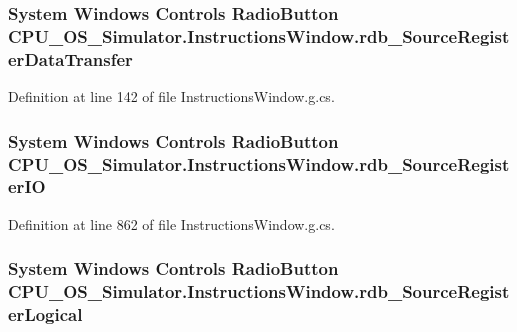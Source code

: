 \subsubsection[{rdb\+\_\+\+Source\+Register\+Data\+Transfer}]{\setlength{\rightskip}{0pt plus 5cm}System Windows Controls Radio\+Button C\+P\+U\+\_\+\+O\+S\+\_\+\+Simulator.\+Instructions\+Window.\+rdb\+\_\+\+Source\+Register\+Data\+Transfer\hspace{0.3cm}{\ttfamily [package]}}\label{class_c_p_u___o_s___simulator_1_1_instructions_window_a0d449427537f2c5baea2e2b7e669a9d7}


Definition at line 142 of file Instructions\+Window.\+g.\+cs.

\hypertarget{class_c_p_u___o_s___simulator_1_1_instructions_window_a30064f400e25a6b155a34108a3fba816}{}
\subsubsection[{rdb\+\_\+\+Source\+Register\+I\+O}]{\setlength{\rightskip}{0pt plus 5cm}System Windows Controls Radio\+Button C\+P\+U\+\_\+\+O\+S\+\_\+\+Simulator.\+Instructions\+Window.\+rdb\+\_\+\+Source\+Register\+I\+O\hspace{0.3cm}{\ttfamily [package]}}\label{class_c_p_u___o_s___simulator_1_1_instructions_window_a30064f400e25a6b155a34108a3fba816}


Definition at line 862 of file Instructions\+Window.\+g.\+cs.

\hypertarget{class_c_p_u___o_s___simulator_1_1_instructions_window_ab8c8622e8a96238fb88e455d60c51e78}{}
\subsubsection[{rdb\+\_\+\+Source\+Register\+Logical}]{\setlength{\rightskip}{0pt plus 5cm}System Windows Controls Radio\+Button C\+P\+U\+\_\+\+O\+S\+\_\+\+Simulator.\+Instructions\+Window.\+rdb\+\_\+\+Source\+Register\+Logical\hspace{0.3cm}{\ttfamily [package]}}\label{class_c_p_u___o_s___simulator_1_1_instructions_window_ab8c8622e8a96238fb88e455d60c51e78}


